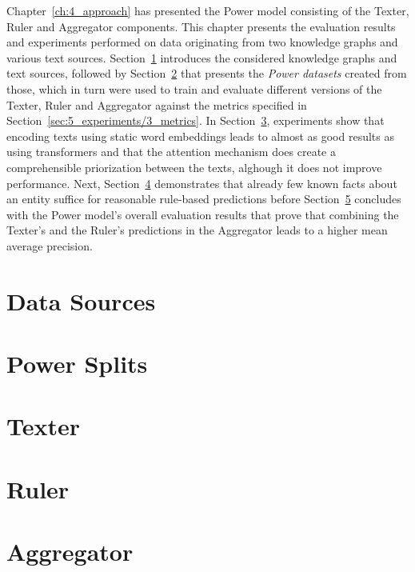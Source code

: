 Chapter~\ref{ch:4_approach} has presented the Power model consisting of the Texter, Ruler and Aggregator components. This chapter presents the evaluation results and experiments performed on data originating from two knowledge graphs and various text sources. Section~\ref{sec:5_experiments/1_data_sources} introduces the considered knowledge graphs and text sources, followed by Section~\ref{sec:5_experiments/2_power_splits} that presents the \emph{Power datasets} created from those, which in turn were used to train and evaluate different versions of the Texter, Ruler and Aggregator against the metrics specified in Section~\ref{sec:5_experiments/3_metrics}. In Section~\ref{sec:5_experiments/4_texter}, experiments show that encoding texts using static word embeddings leads to almost as good results as using transformers and that the attention mechanism does create a comprehensible priorization between the texts, alghough it does not improve performance. Next, Section~\ref{sec:5_experiments/5_ruler} demonstrates that already few known facts about an entity suffice for reasonable rule-based predictions before Section~\ref{sec:5_experiments/6_aggregator} concludes with the Power model's overall evaluation results that prove that combining the Texter's and the Ruler's predictions in the Aggregator leads to a higher mean average precision.


\section{Data Sources}
\label{sec:5_experiments/1_data_sources}



\section{Power Splits}
\label{sec:5_experiments/2_power_splits}



\section{Texter}
\label{sec:5_experiments/4_texter}



\section{Ruler}
\label{sec:5_experiments/5_ruler}



\section{Aggregator}
\label{sec:5_experiments/6_aggregator}

